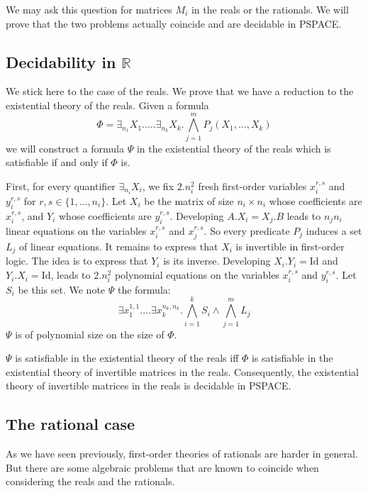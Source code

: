 We may ask this question for matrices $M_i$ in the reals or the rationals. We will prove that the two problems actually coincide and are decidable in PSPACE.


\subsection{Decidability in $\mathbb{R}$}

We stick here to the case of the reals. We prove that we have a reduction to the existential theory of the reals. Given a formula
$$\Phi = \exists_{n_1}X_1.\ldots.\exists_{n_k}X_k. \bigwedge\limits_{j = 1}^m P_j(X_1, \ldots, X_k)$$
we will construct a formula $\Psi$ in the existential theory of the reals which is satisfiable if and only if $\Phi$ is.

First, for every quantifier $\exists_{n_i}X_i$, we fix $2.n_i^2$ fresh first-order variables $x_i^{r,s}$ and $y_i^{r,s}$ for $r,s \in \{1, ..., n_i\}$. Let $X_i$ be the matrix of size $n_i\times n_i$ whose coefficients are $x_i^{r,s}$, and $Y_i$ whose coefficients are $y_i^{r,s}$. Developing $A.X_i = X_j.B$ leads to $n_jn_i$ linear equations on the variables $x_i^{r,s}$ and $x_j^{r,s}$. So every predicate $P_j$ induces a set $L_j$ of linear equations. It remains to express that $X_i$ is invertible in first-order logic. The idea is to express that $Y_i$ is its inverse. Developing $X_i.Y_i = \text{Id}$ and $Y_i.X_i = \text{Id}$, leads to $2.n_i^2$ polynomial equations on the variables $x_i^{r,s}$ and $y_i^{r,s}$. Let $S_i$ be this set. We note $\Psi$ the formula:
$$\exists x_1^{1,1}.\ldots\exists x_k^{n_k,n_k}. \bigwedge\limits_{i=1}^k S_i \wedge \bigwedge\limits_{j=1}^m L_j$$
$\Psi$ is of polynomial size on the size of $\Phi$.

\begin{prop}
$\Psi$ is satisfiable in the existential theory of the reals iff $\Phi$ is satisfiable in the existential theory of invertible matrices in the reals. Consequently, the existential theory of invertible matrices in the reals is decidable in PSPACE.
\end{prop}

\subsection{The rational case}

As we have seen previously, first-order theories of rationals are harder in general. But there are some algebraic problems that are known to coincide when considering the reals and the rationals.

